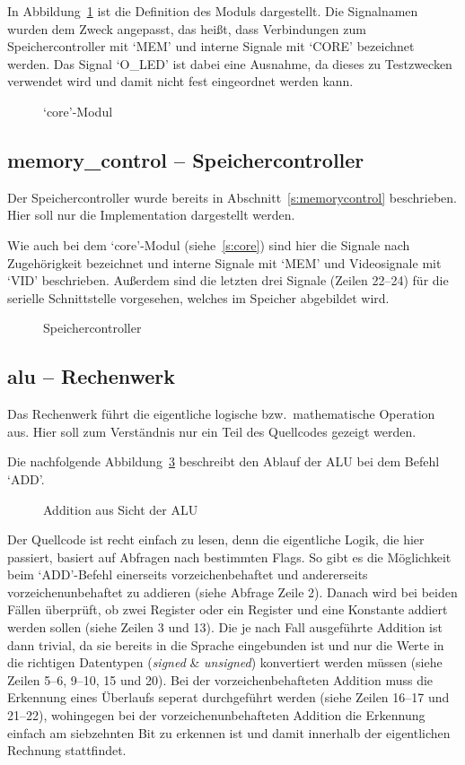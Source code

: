 In Abbildung~\ref{code:core} ist die Definition des Moduls dargestellt. Die
Signalnamen wurden dem Zweck angepasst, das heißt, dass Verbindungen zum
Speichercontroller mit `MEM' und interne Signale mit `CORE' bezeichnet werden.
Das Signal `O\_LED' ist dabei eine Ausnahme, da dieses zu Testzwecken verwendet
wird und damit nicht fest eingeordnet werden kann.
\begin{figure}[htb]

\caption{`core'-Modul}
\label{code:core}
\end{figure}
\pagebreak
\subsection{memory\_control -- Speichercontroller}
\label{s:memcontrol}
Der Speichercontroller wurde bereits in Abschnitt~\ref{s:memorycontrol}
beschrieben. Hier soll nur die Implementation dargestellt werden.

Wie auch bei dem `core'-Modul (siehe~\ref{s:core}) sind hier die Signale nach
Zugehörigkeit bezeichnet und interne Signale mit `MEM' und Videosignale mit
`VID' beschrieben. Außerdem sind die letzten drei Signale (Zeilen 22--24) für
die serielle Schnittstelle vorgesehen, welches im Speicher abgebildet wird.
\begin{figure}[htb]

\caption{Speichercontroller}
\label{code:mem_control}
\end{figure}
\pagebreak
\subsection{alu -- Rechenwerk}
Das Rechenwerk führt die eigentliche logische bzw.\ mathematische Operation aus.
Hier soll zum Verständnis nur ein Teil des Quellcodes gezeigt werden.

Die nachfolgende Abbildung~\ref{code:alu_add} beschreibt den Ablauf der \ac{ALU} bei dem Befehl
`ADD'.

\begin{figure}[htb]

\caption{Addition aus Sicht der ALU}
\label{code:alu_add}
\end{figure}
Der Quellcode ist recht einfach zu lesen, denn die eigentliche Logik, die hier
passiert, basiert auf Abfragen nach bestimmten Flags. So gibt es die Möglichkeit
beim `ADD'-Befehl einerseits vorzeichenbehaftet und andererseits
vorzeichenunbehaftet zu addieren (siehe Abfrage Zeile 2). Danach wird bei beiden
Fällen überprüft, ob zwei Register oder ein Register und eine Konstante addiert
werden sollen (siehe Zeilen 3 und 13). Die je nach Fall ausgeführte Addition ist
dann trivial, da sie bereits in die Sprache eingebunden ist und nur die Werte in
die richtigen Datentypen (\textit{signed} \& \textit{unsigned}) konvertiert
werden müssen (siehe Zeilen 5--6, 9--10, 15 und 20).  Bei der
vorzeichenbehafteten Addition muss die Erkennung eines Überlaufs seperat
durchgeführt werden (siehe Zeilen 16--17 und 21--22), wohingegen bei der
vorzeichenunbehafteten Addition die Erkennung einfach am siebzehnten Bit zu
erkennen ist und damit innerhalb der eigentlichen Rechnung stattfindet.

